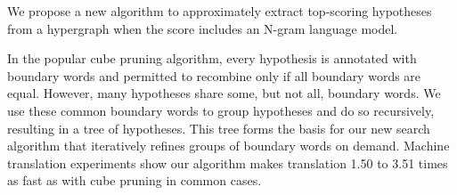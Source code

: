 We propose a new algorithm to approximately extract top-scoring hypotheses from a hypergraph when the score includes an N-gram language model.                       
      
 
   In
 the
 popular
 cube pruning algorithm, every hypothesis is annotated with boundary words and
 permitted to recombine only if all boundary words are equal.  However, many
 hypotheses share some, but not all, boundary words.  We use these common
 boundary words to group hypotheses and do so recursively, resulting in a tree
 of hypotheses.                                      This tree forms the basis for our
 new
 search
 algorithm
 that
 iteratively refines groups of boundary words on demand. Machine translation
 experiments show our algorithm makes translation 1.50 to 3.51 times as fast as
 with cube pruning in common cases.

